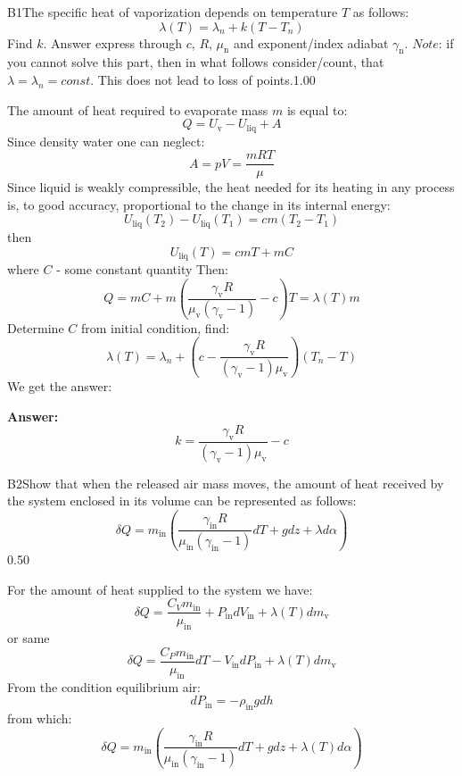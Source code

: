 \documentclass[11pt,a4paper]{article}
\begin{document}
\begin{solcard}{B1}{The specific heat of vaporization depends on temperature $T$ as follows: $$\lambda(T)=\lambda_n+k(T-T_n) $$ Find $k$. Answer express through $c$, $R$, $\mu_\text{n}$ and exponent/index adiabat $\gamma_\text{n}$. $\textit{Note:}$ if you cannot solve this part, then in what follows consider/count, that $\lambda=\lambda_n=const$. This does not lead to loss of points.}{1.00}

The amount of heat required to evaporate mass $m$ is equal to: $$Q=U_\text{v}-U_\text{liq}+A $$ Since density water one can neglect: $$A=pV=\displaystyle\frac{mRT}{\mu} $$ Since liquid is weakly compressible, the heat needed for its heating in any process is, to good accuracy, proportional to the change in its internal energy: $$U_\text{liq}(T_2)-U_\text{liq}(T_1)=cm(T_2-T_1) $$ then $$U_\text{liq}(T)=cmT+mC $$ where $C$ - some constant quantity Then: $$Q=mC+m\left(\displaystyle\frac{\gamma_\text{v}R}{\mu_\text{v}(\gamma_\text{v}-1)}-c\right)T=\lambda(T)m $$ Determine $C$ from initial condition, find: $$\lambda(T)=\lambda_n+\left(c-\frac{\gamma_\text{v}R}{(\gamma_\text{v}-1)\mu_\text{v}}\right)(T_n-T) $$ We get the answer:

\par\smallskip\noindent\textbf{Answer:} $$k=\frac{\gamma_\text{v}R}{(\gamma_\text{v}-1)\mu_\text{v}}-c $$
\end{solcard}

\begin{solcard}{B2}{Show that when the released air mass moves, the amount of heat received by the system enclosed in its volume can be represented as follows: $$\delta{Q}=m_\text{in}\left(\frac{\gamma_\text{in}R}{\mu_\text{in}(\gamma_\text{in}-1)}dT+gdz+\lambda d\alpha\right) $$}{0.50}

For the amount of heat supplied to the system we have: $$\delta{Q}=\frac{C_Vm_\text{in}}{\mu_\text{in}}+P_\text{in}dV_\text{in}+\lambda(T)dm_\text{v} $$ or same $$\delta{Q}=\frac{C_Pm_\text{in}}{\mu_\text{in}}dT-V_\text{in}dP_\text{in}+\lambda(T)dm_\text{v} $$ From the condition equilibrium air: $$dP_\text{in}=-\rho_\text{in}gdh $$ from which: $$\delta{Q}=m_\text{in}\left(\frac{\gamma_\text{in}R}{\mu_\text{in}(\gamma_\text{in}-1)}dT+gdz+\lambda(T)d\alpha\right) $$

\end{solcard}
\end{document}
